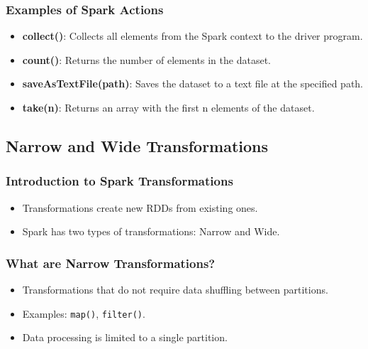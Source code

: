 \begin{frame}
    \frametitle{Examples of Spark Actions}
    \begin{itemize}
        \item \textbf{collect()}: Collects all elements from the Spark context to the driver program.
        \item \textbf{count()}: Returns the number of elements in the dataset.
        \item \textbf{saveAsTextFile(path)}: Saves the dataset to a text file at the specified path.
        \item \textbf{take(n)}: Returns an array with the first n elements of the dataset.
    \end{itemize}
\end{frame}


\subsection{Narrow and Wide Transformations}\label{subsec:narrow-and-wide-transformations}
\begin{frame}
    \frametitle{Introduction to Spark Transformations}
    \begin{itemize}
        \item Transformations create new RDDs from existing ones.
        \item Spark has two types of transformations: Narrow and Wide.
    \end{itemize}
\end{frame}

\begin{frame}
    \frametitle{What are Narrow Transformations?}
    \begin{itemize}
        \item Transformations that do not require data shuffling between partitions.
        \item Examples: \texttt{map()}, \texttt{filter()}.
        \item Data processing is limited to a single partition.
    \end{itemize}
\end{frame}

